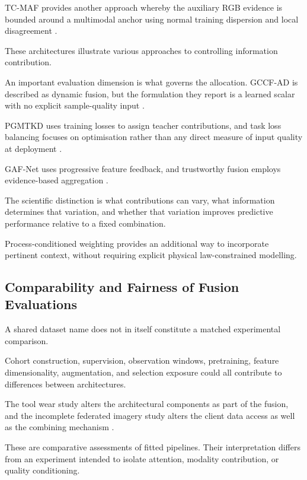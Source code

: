 TC-MAF provides another approach whereby the auxiliary RGB evidence is bounded around a multimodal
anchor using normal training dispersion and local disagreement \parencite[PDF pp.~3--5]{P026}.

These architectures illustrate various approaches to controlling information contribution.

An important evaluation dimension is what governs the allocation. GCCF-AD is described as dynamic
fusion, but the formulation they report is a learned scalar with no explicit sample-quality input
\parencite[p.~149226, Eq.~8]{P038}.

PGMTKD uses training losses to assign teacher contributions, and task loss balancing focuses on
optimisation rather than any direct measure of input quality at deployment
\parencite{Li2025PGMTKD,P045}.

GAF-Net uses progressive feature feedback, and trustworthy fusion employs evidence-based aggregation
\parencite{Huang2026Rolling,Ying2025Trustworthy}.

The scientific distinction is what contributions can vary, what information determines that
variation, and whether that variation improves predictive performance relative to a fixed
combination.

Process-conditioned weighting provides an additional way to incorporate pertinent context, without
requiring explicit physical law-constrained modelling.

\subsection{Comparability and Fairness of Fusion Evaluations}

A shared dataset name does not in itself constitute a matched experimental comparison.

Cohort construction, supervision, observation windows, pretraining, feature dimensionality,
augmentation, and selection exposure could all contribute to differences between architectures.

The tool wear study alters the architectural components as part of the fusion, and the incomplete
federated imagery study alters the client data access as well as the combining mechanism
\parencite{P045,P051}.

These are comparative assessments of fitted pipelines. Their interpretation differs from an
experiment intended to isolate attention, modality contribution, or quality conditioning.

